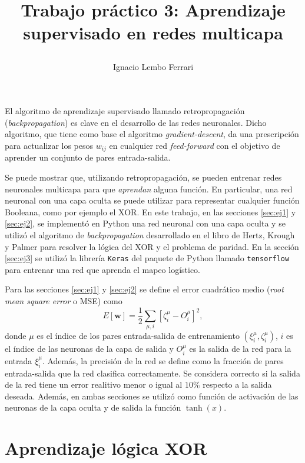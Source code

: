 \documentclass[11pt,twocolumn,twoside]{opticajnl}
\title{
\vspace{0.1cm} 

Trabajo práctico 3: Aprendizaje supervisado en redes multicapa}
\author[1]{\huge{Ignacio Lembo Ferrari}}
\affil[1]{\large{ignaciolembo@ib.edu.ar} 

\vspace{0.1cm}

{\datesfont 14 de octubre de 2023.}

\vspace{0.1cm}
}
\begin{document}
\maketitle

El algoritmo de aprendizaje supervisado llamado retropropagación (\textit{backpropagation}) es clave en el desarrollo de las redes neuronales. Dicho algoritmo, que tiene como base el algoritmo \textit{gradient-descent}, da una prescripción para actualizar los pesos $w_{ij}$ en cualquier red \textit{feed-forward} con el objetivo de aprender un conjunto de pares entrada-salida. 

Se puede mostrar que, utilizando retropropagación, se pueden entrenar redes neuronales multicapa para que \textit{aprendan} alguna función. En particular, una red neuronal con una capa oculta se puede utilizar para representar cualquier función Booleana, como por ejemplo el XOR. En este trabajo, en las secciones \ref{sec:ej1} y \ref{sec:ej2}, se implementó en Python una red neuronal con una capa oculta y se utilizó el algoritmo de \textit{backpropagation} desarrollado en el libro de Hertz, Krough y Palmer para resolver la lógica del XOR y el problema de paridad. En la sección \ref{sec:ej3} se utilizó la librería \texttt{Keras} del paquete de Python llamado \texttt{tensorflow} para entrenar una red que aprenda el mapeo logístico.

Para las secciones \ref{sec:ej1} y \ref{sec:ej2} se define el error cuadrático medio (\textit{root mean square error} o MSE) como
\begin{equation}
    E[\boldsymbol{w}] = \frac{1}{2} \sum_{\mu,i} \left[ \zeta_i^{\mu} - O_i^{\mu} \right]^2,
\end{equation}
donde $\mu$ es el índice de los pares entrada-salida de entrenamiento $(\xi_i^\mu, \zeta_i^\mu)$, $i$ es el índice de las neuronas de la capa de salida y $O_i^{\mu}$ es la salida de la red para la entrada $\xi_i^\mu$. Además, la precisión de la red se define como la fracción de pares entrada-salida que la red clasifica correctamente. Se considera correcto si la salida de la red tiene un error realitivo menor o igual al $10\%$ respecto a la salida deseada. Además, en ambas secciones se utilizó como función de activación de las neuronas de la capa oculta y de salida la función $\tanh(x)$. 


\section{Aprendizaje lógica XOR \label{sec:ej1}}
\end{document}
